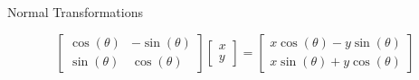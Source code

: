 \documentclass{beamer}
\begin{document}
\begin{frame}{Normal Transformations}

\[ \left[ \begin{array}{cc} \cos(\theta) & -\sin(\theta)\\ \sin(\theta) & \cos(\theta) \end{array} \right] \left[ \begin{array}{c} x \\ y \end{array} \right] =  \left[ \begin{array}{c} x \cos(\theta) - y\sin(\theta) \\ x \sin(\theta) + y\cos(\theta) \end{array} \right] \]

\begin{figure}[t]
    \captionsetup[subfloat]{labelformat=empty}
	\centering
\end{figure}

\end{frame}
\end{document}
